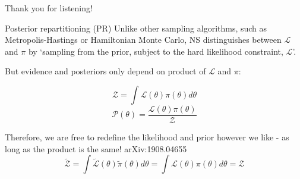 \documentclass[aspectratio=169]{beamer}
\def \bblock{\begin{beamerboxesrounded}[upper=uppercolor,lower=lowercolor,shadow=true]}
\def \eblock{\end{beamerboxesrounded}}
\begin{document}
\begin{frame}{}
\centering
    Thank you for listening!
\end{frame}

\begin{frame}{Posterior repartitioning (PR)}
Unlike other sampling algorithms, such as Metropolis-Hastings or Hamiltonian Monte Carlo, NS distinguishes between $\mathcal{L}$ and $\pi$ by \alert{`sampling from the prior, subject to the hard likelihood constraint, $\mathcal{L}$'}.

But evidence and posteriors only depend on product of $\mathcal{L}$ and $\pi$: \vspace{-2em}
\begin{multicols}{2}
\begin{equation}
    \mathcal{Z} = \int \mathcal{L}(\theta) \pi(\theta) d\theta
\end{equation}\break
\begin{equation}
    \mathcal{P}(\theta) = \frac{\mathcal{L}(\theta)\pi(\theta)}{\mathcal{Z}}
\end{equation}
\end{multicols}
\bblock{Therefore, we are free to redefine the likelihood and prior however we like - as long as the product is the same! \textcolor{cfgrey}{arXiv:1908.04655}}
    \centering
    \begin{equation}
        \tilde{\mathcal{Z}} = \int \tilde{\mathcal{L}}(\theta) \tilde{\pi}(\theta) d\theta = \int \mathcal{L}(\theta) \pi(\theta) d\theta = \mathcal{Z}
    \end{equation}
\eblock
\end{frame}








\end{document}
